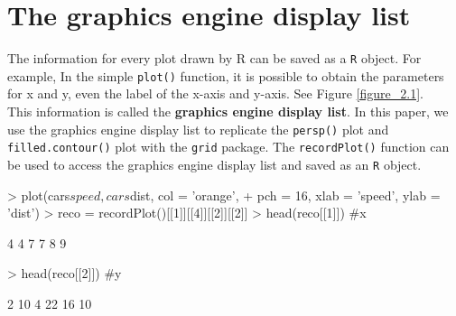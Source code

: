 \documentclass[11pt,twoside]{report}
\begin{document}
\chapter{The graphics engine display list}
The information for every plot drawn by R can be saved as a \texttt{R} object. For example, In the simple \texttt{plot()} function, it is possible to obtain the parameters for x and y, even the label of the x-axis and y-axis. See Figure \ref{figure_2.1}.\\

This information is called the \textbf{graphics engine display list}. In this paper, we use the graphics engine display list to replicate the \texttt{persp()} plot and \texttt{filled.contour()} plot with the \texttt{grid} package. The \texttt{recordPlot()} function can be used to access the graphics engine display list and saved as an \texttt{R} object.

\begin{Schunk}
\begin{Sinput}
> plot(cars$speed, cars$dist, col = 'orange', 
+       pch = 16, xlab = 'speed', ylab = 'dist')
> reco = recordPlot()[[1]][[4]][[2]][[2]]
> head(reco[[1]]) #x
\end{Sinput}
\begin{Soutput}
[1] 4 4 7 7 8 9
\end{Soutput}
\begin{Sinput}
> head(reco[[2]]) #y
\end{Sinput}
\begin{Soutput}
[1]  2 10  4 22 16 10
\end{Soutput}
\end{Schunk}
\end{document}
